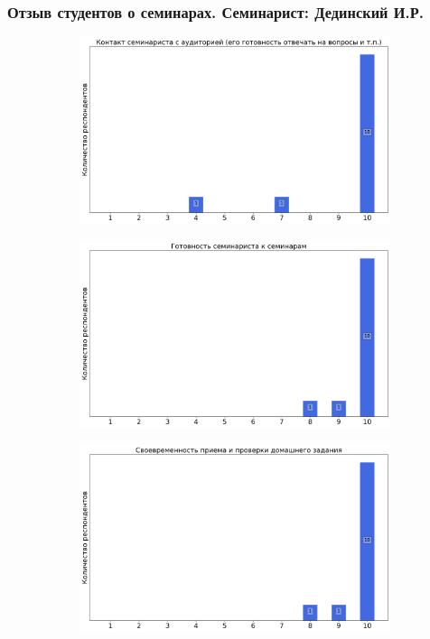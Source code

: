     
    \subsubsection{Отзыв студентов о семинарах. Семинарист: Дединский И.Р.}
		\begin{figure}[H]
			\centering
			\begin{subfigure}[b]{0.45\textwidth}
				\centering
				\includegraphics[width=\textwidth]{images/1 course/Информатика/seminarists-marks-Дединский И.Р.-0.png}
			\end{subfigure}
			\begin{subfigure}[b]{0.45\textwidth}
				\centering
				\includegraphics[width=\textwidth]{images/1 course/Информатика/seminarists-marks-Дединский И.Р.-1.png}
			\end{subfigure}
			\begin{subfigure}[b]{0.45\textwidth}
				\centering
				\includegraphics[width=\textwidth]{images/1 course/Информатика/seminarists-marks-Дединский И.Р.-2.png}

\end{subfigure}
\end{figure}
